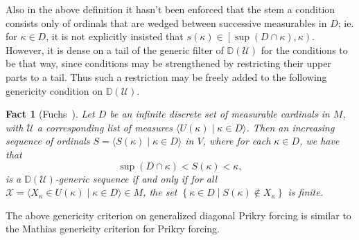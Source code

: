 \documentclass{amsart}
\newtheorem{fact}[theorem]{Fact}
\theoremstyle{definition}
\theoremstyle{remark}
\newcommand{\D}{\mathbb{D}}
\newcommand{\U}{\mathcal{U}}
\newcommand{\st}{\; | \;}
\newcommand{\set}[2]{\left\{#1\st #2 \right\}}
\newcommand{\seq}[2]{\langle #1 \st #2 \rangle}
\begin{document}
Also in the above definition it hasn't been enforced that the stem a condition consists only of ordinals that are wedged between successive measurables in $D$; ie. for $\kappa \in D$, it is not explicitly insisted that $s(\kappa) \in \left[\sup(D\cap \kappa), \kappa\right)$. However, it is dense on a tail of the generic filter of $\D(\U)$ for the conditions to be that way, since conditions may be strengthened by restricting their upper parts to a tail. 
Thus such a restriction may be freely added to the following genericity condition on $\D(\U)$.

\begin{fact}[Fuchs~{\cite[Thm.~1]{Fuchs:2005kx}}] \label{fact:diagprikrymathias} Let $D$ be an infinite discrete set of measurable cardinals in $M$, with $\U$ a corresponding list of measures $\langle U(\kappa) \;|\; \kappa \in D \rangle$. Then an increasing sequence of ordinals $S = \seq{ S(\kappa) }{ \kappa \in D }$ in $V$, where for each $\kappa \in D$, we have that $$\sup(D \cap \kappa) < S(\kappa) < \kappa,$$ is a $\D(\U)$-generic  sequence if and only if for all $\mathcal X = \seq{ X_\kappa \in U(\kappa) }{ \kappa \in D } \in M$, the set $\set{ \kappa \in D }{ S(\kappa) \notin X_\kappa }$ is finite.
\end{fact}

The above genericity criterion on generalized diagonal Prikry forcing is similar to the Mathias genericity criterion for Prikry forcing.
\end{document}
